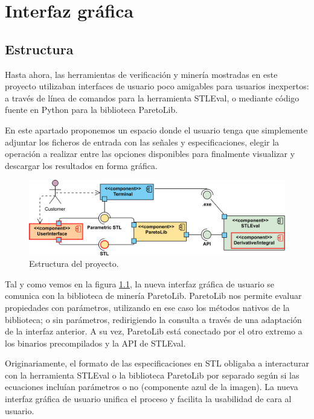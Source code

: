 \chapter{Interfaz gráfica}
\label{cha:gui}

\section{Estructura}
Hasta ahora, las herramientas de verificación y minería mostradas en este proyecto utilizaban interfaces de usuario poco amigables para usuarios inexpertos: a través de línea de comandos para la herramienta STLEval, o mediante código fuente en Python para la biblioteca ParetoLib.

En este apartado proponemos un espacio donde el usuario tenga que simplemente adjuntar los ficheros de entrada con las señales y especificaciones, elegir la operación a realizar entre las opciones disponibles para finalmente visualizar y descargar los resultados en forma gráfica.

\begin{figure}[htb]
\centering
  \includegraphics[width=.95\linewidth]{images/uml_diagram}
\caption{Estructura del proyecto.}
\label{fig:est}
\end{figure}

Tal y como vemos en la figura \ref{fig:est}, la nueva interfaz gráfica de usuario se comunica con la biblioteca de minería ParetoLib. ParetoLib nos permite evaluar propiedades con parámetros, utilizando en ese caso los métodos nativos de la biblioteca; o sin parámetros, redirigiendo la consulta a través de una adaptación de la interfaz anterior. A su vez, ParetoLib está conectado por el otro extremo a los binarios precompilados y la API de STLEval.

Originariamente, el formato de las especificaciones en STL obligaba a interacturar con la herramienta STLEval o la biblioteca ParetoLib por separado según si las ecuaciones incluían parámetros o no (componente azul de la imagen).
La nueva interfaz gráfica de usuario unifica el proceso y facilita la usabilidad de cara al usuario.


